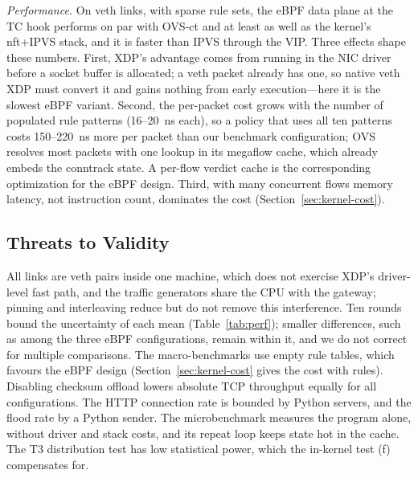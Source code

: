 \documentclass[conference]{IEEEtran}
\begin{document}
\textit{Performance.} On veth links, with sparse rule sets, the eBPF data
plane at the TC hook performs on par with OVS-ct and at least as well as the
kernel's nft+IPVS stack, and it is faster than IPVS through the VIP. Three
effects shape these numbers. First, XDP's advantage comes from running in the
NIC driver before a socket buffer is allocated; a veth packet already has
one, so native veth XDP must convert it and gains nothing from early
execution---here it is the slowest eBPF variant. Second, the per-packet cost
grows with the number of populated rule patterns (16--20~ns each), so a
policy that uses all ten patterns costs 150--220~ns more per packet than
our benchmark configuration; OVS resolves most packets with one lookup in its
megaflow cache, which already embeds the conntrack state. A per-flow verdict
cache is the corresponding optimization for the eBPF design. Third, with
many concurrent flows memory latency, not instruction count, dominates the
cost (Section~\ref{sec:kernel-cost}).

\subsection{Threats to Validity}
\label{sec:threats}
All links are veth pairs inside one machine, which does not exercise XDP's
driver-level fast path, and the traffic generators share the CPU with the
gateway; pinning and interleaving reduce but do not remove this interference.
Ten rounds bound the uncertainty of each mean (Table~\ref{tab:perf}); smaller
differences, such as among the three eBPF configurations, remain within it,
and we do not correct for multiple comparisons. The macro-benchmarks use
empty rule tables, which favours the eBPF design (Section~\ref{sec:kernel-cost}
gives the cost with rules). Disabling checksum offload lowers absolute TCP
throughput equally for all configurations. The HTTP connection rate is
bounded by Python servers, and the flood rate by a Python sender. The
microbenchmark measures the program alone, without driver and stack costs,
and its repeat loop keeps state hot in the cache. The T3 distribution test
has low statistical power, which the in-kernel test (f) compensates for.

\end{document}
